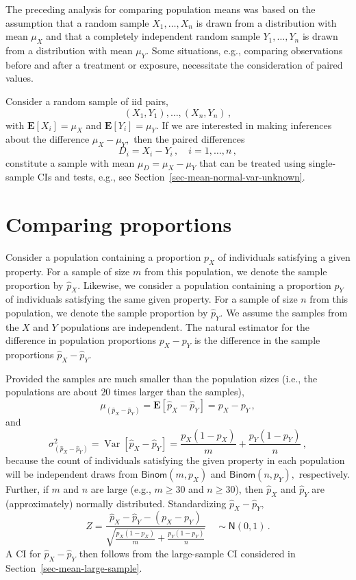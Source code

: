 \documentclass[
  a4paper,
  DIV=11,
  numbers=noendperiod,
  oneside]{scrreprt}
\theoremstyle{definition}
\theoremstyle{definition}
\theoremstyle{plain}
\theoremstyle{plain}
\theoremstyle{definition}
\theoremstyle{remark}
\begin{document}
The preceding analysis for comparing population means was based on the
assumption that a random sample \(X_1, \dots, X_n\) is drawn from a
distribution with mean \(\mu_X\) and that a completely independent
random sample \(Y_1, \dots, Y_n\) is drawn from a distribution with mean
\(\mu_Y.\) Some situations, e.g., comparing observations before and
after a treatment or exposure, necessitate the consideration of paired
values.

Consider a random sample of iid pairs, \[
(X_1, Y_1), \dots, (X_n, Y_n)\,,
\] with \(\mathbf{E}[X_i] = \mu_X\) and \(\mathbf{E}[Y_i] = \mu_Y.\) If
we are interested in making inferences about the difference
\(\mu_X - \mu_Y,\) then the paired differences \[
D_i = X_i - Y_i \,,\quad  i=1, \dots, n\,,
\] constitute a sample with mean \(\mu_D = \mu_X - \mu_Y\) that can be
treated using single-sample CIs and tests, e.g., see
Section~\ref{sec-mean-normal-var-unknown}.

\section{Comparing proportions}\label{sec-compare-proportions}

Consider a population containing a proportion \(p_X\) of individuals
satisfying a given property. For a sample of size \(m\) from this
population, we denote the sample proportion by \(\widehat{p}_X.\)
Likewise, we consider a population containing a proportion \(p_Y\) of
individuals satisfying the same given property. For a sample of size
\(n\) from this population, we denote the sample proportion by
\(\widehat{p}_Y.\) We assume the samples from the \(X\) and \(Y\)
populations are independent. The natural estimator for the difference in
population proportions \(p_X - p_Y\) is the difference in the sample
proportions \(\widehat{p}_X - \widehat{p}_Y.\)

Provided the samples are much smaller than the population sizes (i.e.,
the populations are about \(20\) times larger than the samples), \[
 \mu_{(\widehat{p}_X - \widehat{p}_Y)} = \mathbf{E}[\widehat{p}_X - \widehat{p}_Y] = p_X - p_Y\,,
\] and \[
 \sigma_{(\widehat{p}_X - \widehat{p}_Y)}^2 = \mathop{\mathrm{Var}}[\widehat{p}_X - \widehat{p}_Y] 
 = \frac{p_X(1-p_X)}{m} + \frac{p_Y(1-p_Y)}{n}\,,
\] because the count of individuals satisfying the given property in
each population will be independent draws from
\(\mathsf{Binom}(m, p_X)\) and \(\mathsf{Binom}(n, p_Y),\) respectively.
Further, if \(m\) and \(n\) are large (e.g., \(m \geq 30\) and
\(n \geq 30\)), then \(\widehat{p}_X\) and \(\widehat{p}_Y\) are
(approximately) normally distributed. Standardizing
\(\widehat{p}_X - \widehat{p}_Y,\) \[
 Z = \frac{\widehat{p}_X - \widehat{p}_Y - (p_X - p_Y)}{\sqrt{\frac{p_X(1-p_X)}{m} + \frac{p_Y(1-p_Y)}{n}}}
 \quad \sim \mathsf{N}(0,1)\,.
\] A CI for \(\widehat{p}_X - \widehat{p}_Y\) then follows from the
large-sample CI considered in Section~\ref{sec-mean-large-sample}.
\end{document}
